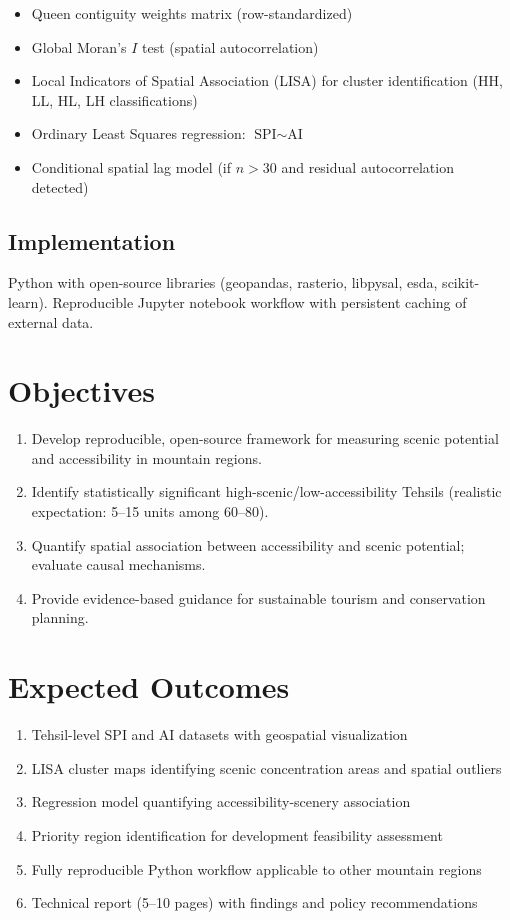 \documentclass[12pt, a4paper]{article}
\begin{document}
\begin{itemize}
    \item Queen contiguity weights matrix (row-standardized)
    \item Global Moran's $I$ test (spatial autocorrelation)
    \item Local Indicators of Spatial Association (LISA) for cluster identification (HH, LL, HL, LH classifications)
    \item Ordinary Least Squares regression: $\text{SPI} \sim \text{AI}$
    \item Conditional spatial lag model (if $n > 30$ and residual autocorrelation detected)
\end{itemize}

\subsection{Implementation}

Python with open-source libraries (geopandas, rasterio, libpysal, esda, scikit-learn). Reproducible Jupyter notebook workflow with persistent caching of external data.

\section{Objectives}

\begin{enumerate}
    \item Develop reproducible, open-source framework for measuring scenic potential and accessibility in mountain regions.
    \item Identify statistically significant high-scenic/low-accessibility Tehsils (realistic expectation: 5--15 units among 60--80).
    \item Quantify spatial association between accessibility and scenic potential; evaluate causal mechanisms.
    \item Provide evidence-based guidance for sustainable tourism and conservation planning.
\end{enumerate}

\section{Expected Outcomes}

\begin{enumerate}
    \item Tehsil-level SPI and AI datasets with geospatial visualization
    \item LISA cluster maps identifying scenic concentration areas and spatial outliers
    \item Regression model quantifying accessibility-scenery association
    \item Priority region identification for development feasibility assessment
    \item Fully reproducible Python workflow applicable to other mountain regions
    \item Technical report (5--10 pages) with findings and policy recommendations
\end{enumerate}
\end{document}
